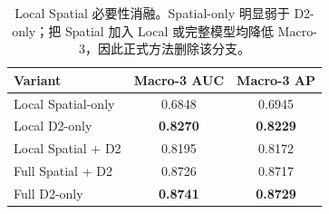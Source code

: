 \begin{table}[t]
  \centering
  \caption{Local Spatial 必要性消融。Spatial-only 明显弱于 D2-only；把 Spatial 加入 Local 或完整模型均降低 Macro-3，因此正式方法删除该分支。}
  \label{tab:spatial_ablation}
  {\scriptsize
  \setlength{\tabcolsep}{4.2pt}
  \renewcommand{\arraystretch}{1.10}
  \begin{tabular}{lcc}
    \toprule
    Variant & Macro-3 AUC & Macro-3 AP \\
    \midrule
    Local Spatial-only & 0.6848 & 0.6945 \\
    Local D2-only & \textbf{0.8270} & \textbf{0.8229} \\
    Local Spatial + D2 & 0.8195 & 0.8172 \\
    \midrule
    Full Spatial + D2 & 0.8726 & 0.8717 \\
    Full D2-only & \textbf{0.8741} & \textbf{0.8729} \\
    \bottomrule
  \end{tabular}}
\end{table}
